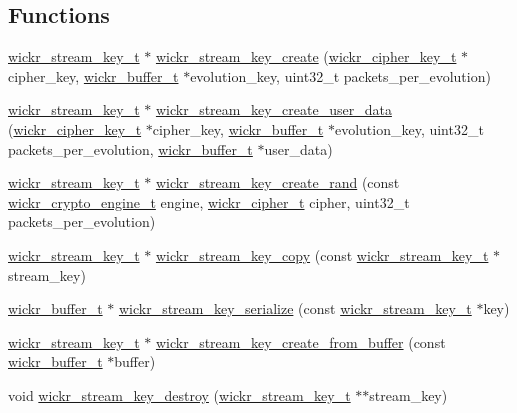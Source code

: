 \subsection*{Functions}
\begin{DoxyCompactItemize}
\item 
\hyperlink{structwickr__stream__key}{wickr\+\_\+stream\+\_\+key\+\_\+t} $\ast$ \hyperlink{group__wickr__stream__key_ga54449667a25d9e64cd04dae58dd76418}{wickr\+\_\+stream\+\_\+key\+\_\+create} (\hyperlink{structwickr__cipher__key}{wickr\+\_\+cipher\+\_\+key\+\_\+t} $\ast$cipher\+\_\+key, \hyperlink{structwickr__buffer}{wickr\+\_\+buffer\+\_\+t} $\ast$evolution\+\_\+key, uint32\+\_\+t packets\+\_\+per\+\_\+evolution)
\item 
\hyperlink{structwickr__stream__key}{wickr\+\_\+stream\+\_\+key\+\_\+t} $\ast$ \hyperlink{group__wickr__stream__key_gaff8e766f3519e9e73157938bd1d3e024}{wickr\+\_\+stream\+\_\+key\+\_\+create\+\_\+user\+\_\+data} (\hyperlink{structwickr__cipher__key}{wickr\+\_\+cipher\+\_\+key\+\_\+t} $\ast$cipher\+\_\+key, \hyperlink{structwickr__buffer}{wickr\+\_\+buffer\+\_\+t} $\ast$evolution\+\_\+key, uint32\+\_\+t packets\+\_\+per\+\_\+evolution, \hyperlink{structwickr__buffer}{wickr\+\_\+buffer\+\_\+t} $\ast$user\+\_\+data)
\item 
\hyperlink{structwickr__stream__key}{wickr\+\_\+stream\+\_\+key\+\_\+t} $\ast$ \hyperlink{group__wickr__stream__key_ga9e95dd486dbe2f3db647c65042601b34}{wickr\+\_\+stream\+\_\+key\+\_\+create\+\_\+rand} (const \hyperlink{structwickr__crypto__engine}{wickr\+\_\+crypto\+\_\+engine\+\_\+t} engine, \hyperlink{structwickr__cipher}{wickr\+\_\+cipher\+\_\+t} cipher, uint32\+\_\+t packets\+\_\+per\+\_\+evolution)
\item 
\hyperlink{structwickr__stream__key}{wickr\+\_\+stream\+\_\+key\+\_\+t} $\ast$ \hyperlink{group__wickr__stream__key_ga0201dd73adf773834d7dbb4bbc307fae}{wickr\+\_\+stream\+\_\+key\+\_\+copy} (const \hyperlink{structwickr__stream__key}{wickr\+\_\+stream\+\_\+key\+\_\+t} $\ast$stream\+\_\+key)
\item 
\hyperlink{structwickr__buffer}{wickr\+\_\+buffer\+\_\+t} $\ast$ \hyperlink{group__wickr__stream__key_gae1540c98a88e2f62e96fb2ee209e2290}{wickr\+\_\+stream\+\_\+key\+\_\+serialize} (const \hyperlink{structwickr__stream__key}{wickr\+\_\+stream\+\_\+key\+\_\+t} $\ast$key)
\item 
\hyperlink{structwickr__stream__key}{wickr\+\_\+stream\+\_\+key\+\_\+t} $\ast$ \hyperlink{group__wickr__stream__key_gadf1565329fed927531e1a14334ed23e4}{wickr\+\_\+stream\+\_\+key\+\_\+create\+\_\+from\+\_\+buffer} (const \hyperlink{structwickr__buffer}{wickr\+\_\+buffer\+\_\+t} $\ast$buffer)
\item 
void \hyperlink{group__wickr__stream__key_ga3bb3dec760c5b7f3a1bd2d0bb13bcc79}{wickr\+\_\+stream\+\_\+key\+\_\+destroy} (\hyperlink{structwickr__stream__key}{wickr\+\_\+stream\+\_\+key\+\_\+t} $\ast$$\ast$stream\+\_\+key)
\end{DoxyCompactItemize}


